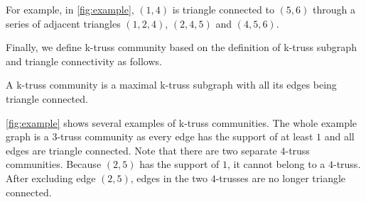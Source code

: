 For example, in \autoref{fig:example}, $(1,4)$ is triangle connected to $(5,6)$ through a series of adjacent triangles $(1,2,4)$, $(2,4,5)$ and $(4,5,6)$.


Finally, we define k-truss community based on the definition of k-truss subgraph and triangle connectivity as follows.

\begin{Def} 
A k-truss community is a maximal k-truss subgraph with all its edges being triangle connected.
\label{def:k-truss_community}
\end{Def}

\autoref{fig:example} shows several examples of k-truss communities. The whole example graph is a $3$-truss community as every edge has the support of at least $1$ and all edges are triangle connected. Note that there are two separate $4$-truss communities. Because $(2,5)$ has the support of $1$, it cannot belong to a $4$-truss. After excluding edge $(2,5)$, edges in the two $4$-trusses are no longer triangle connected.
